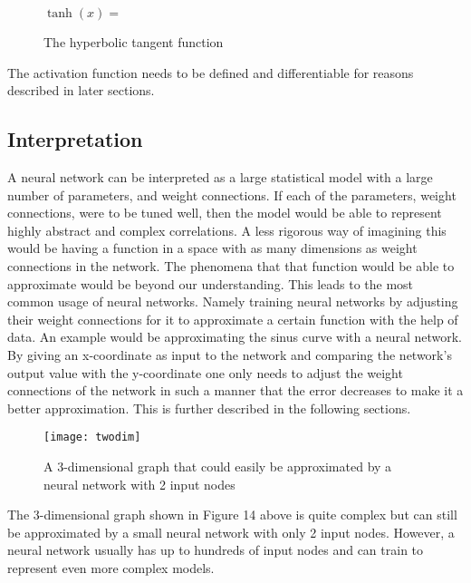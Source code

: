 \documentclass[titlepage]{article}
\begin{document}
\vskip 0.4cm

\begin{figure}[h]
    \centerline{$\tanh(x) =$ }
    \vskip 0.2cm
    \caption{The hyperbolic tangent function}
\end{figure}

\vskip 0.2cm

\noindent
The activation function needs to be defined and differentiable for reasons described in later sections.

\newpage

\subsection{Interpretation}

\vskip 0.2cm

A neural network can be interpreted as a large statistical model with a large number of parameters, and weight connections. If each of the parameters, weight connections, were to be tuned well, then the model would be able to represent highly abstract and complex correlations. A less rigorous way of imagining this would be having a function in a space with as many dimensions as weight connections in the network. The phenomena that that function would be able to approximate would be beyond our understanding. This leads to the most common usage of neural networks. Namely training neural networks by adjusting their weight connections for it to approximate a certain function with the help of data. An example would be approximating the sinus curve with a neural network. By giving an x-coordinate as input to the network and comparing the network's output value with the y-coordinate one only needs to adjust the weight connections of the network in such a manner that the error decreases to make it a better approximation. This is further described in the following sections.

\vskip 0.5cm

\begin{figure}[h]
    \center
    \texttt{[image: twodim]}
    \vskip 0.3cm
    \caption{A 3-dimensional graph that could easily be approximated by a neural network with 2 input nodes}
\end{figure}

\vskip 0.2cm

\noindent
The 3-dimensional graph shown in Figure 14 above is quite complex but can still be approximated by a small neural network with only 2 input nodes. However, a neural network usually has up to hundreds of input nodes and can train to represent even more complex models.
\end{document}
